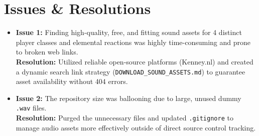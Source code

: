 \documentclass[12pt,a4paper]{article}
\begin{document}
\section*{Issues \& Resolutions}
\begin{itemize}
    \item \textbf{Issue 1:} Finding high-quality, free, and fitting sound assets for 4 distinct player classes and elemental reactions was highly time-consuming and prone to broken web links. \\
    \textbf{Resolution:} Utilized reliable open-source platforms (Kenney.nl) and created a dynamic search link strategy (\texttt{DOWNLOAD\_SOUND\_ASSETS.md}) to guarantee asset availability without 404 errors.
    
    \item \textbf{Issue 2:} The repository size was ballooning due to large, unused dummy \texttt{.wav} files. \\
    \textbf{Resolution:} Purged the unnecessary files and updated \texttt{.gitignore} to manage audio assets more effectively outside of direct source control tracking.
\end{itemize}
\end{document}
